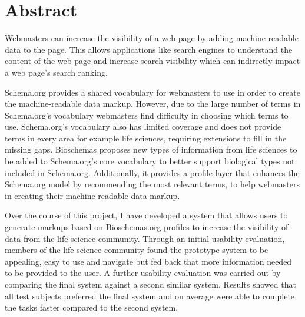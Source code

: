 \chapter*{Abstract}

Webmasters can increase the visibility of a web page by adding machine-readable data to the page. This allows applications like search engines to understand the content of the web page and increase search visibility which can indirectly impact a web page's search ranking. 

Schema.org provides a shared vocabulary for webmasters to use in order to create the machine-readable data markup. However, due to the large number of terms in Schema.org's vocabulary webmasters find difficulty in choosing which terms to use. Schema.org's vocabulary also has limited coverage and does not provide terms in every area for example life sciences, requiring extensions to fill in the missing gaps. Bioschemas proposes new types of information from life sciences to be added to Schema.org's core vocabulary to better support biological types not included in Schema.org. Additionally, it provides a profile layer that enhances the Schema.org model by recommending the most relevant terms,
to help webmasters in creating their machine-readable data markup.

Over the course of this project, I have developed a system that allows users to generate markups based on Bioschemas.org profiles to increase the visibility of data from the life science community. Through an initial usability evaluation, members of the life science community found the prototype system to be appealing, easy to use and navigate but fed back that more information needed to be provided to the user. A further usability evaluation was carried out by comparing the final system against a second similar system. Results showed that all test subjects preferred the final system and on average were able to complete the tasks faster compared to the second system.
